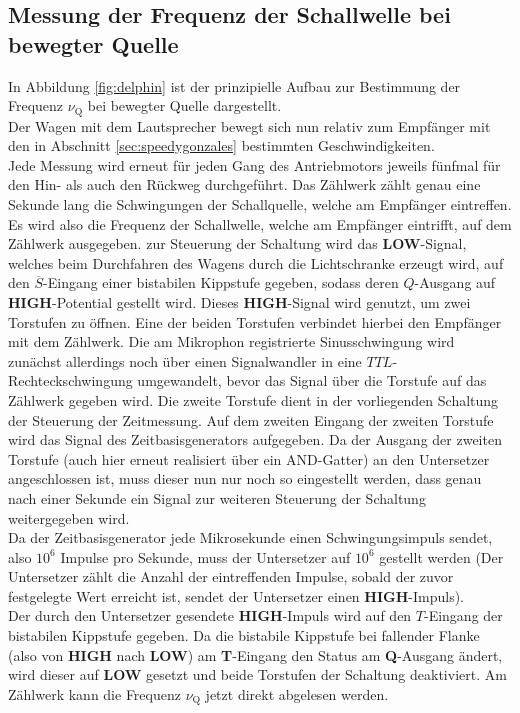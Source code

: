 \FloatBarrier
\subsection{Messung der Frequenz der Schallwelle bei bewegter Quelle}
\label{sec:frequenz}
In Abbildung \ref{fig:delphin} ist der prinzipielle Aufbau zur Bestimmung der Frequenz $\nu_{\mathrm{Q}}$ bei bewegter Quelle dargestellt.\\
Der Wagen mit dem Lautsprecher bewegt sich nun relativ zum Empfänger mit den in Abschnitt \ref{sec:speedygonzales} bestimmten Geschwindigkeiten.\\
Jede Messung wird erneut für jeden Gang des Antriebmotors jeweils fünfmal für den Hin- als auch den Rückweg durchgeführt.
Das Zählwerk zählt genau eine Sekunde lang die Schwingungen der Schallquelle, welche am Empfänger eintreffen. Es wird also die Frequenz der Schallwelle, welche am Empfänger eintrifft, auf dem Zählwerk ausgegeben.
zur Steuerung der Schaltung wird das \textbf{LOW}-Signal, welches beim Durchfahren des Wagens durch die Lichtschranke erzeugt wird, auf den $\overline{S}$-Eingang einer bistabilen Kippstufe gegeben, sodass deren $Q$-Ausgang auf \textbf{HIGH}-Potential gestellt wird.
Dieses \textbf{HIGH}-Signal wird genutzt, um zwei Torstufen zu öffnen.
Eine der beiden Torstufen verbindet hierbei den Empfänger mit dem Zählwerk.
Die am Mikrophon registrierte Sinusschwingung wird zunächst allerdings noch über einen Signalwandler in eine $TTL$-Rechteckschwingung umgewandelt, bevor das Signal über die Torstufe auf das Zählwerk gegeben wird.
Die zweite Torstufe dient in der vorliegenden Schaltung der Steuerung der Zeitmessung.
Auf dem zweiten Eingang der zweiten Torstufe wird das Signal des Zeitbasisgenerators aufgegeben.
Da der Ausgang der zweiten Torstufe (auch hier erneut realisiert über ein AND-Gatter) an den Untersetzer angeschlossen ist, muss dieser nun nur noch so eingestellt werden, dass genau nach einer Sekunde ein Signal
zur weiteren Steuerung der Schaltung weitergegeben wird.\\
Da der Zeitbasisgenerator jede Mikrosekunde einen Schwingungsimpuls sendet, also $10^6$ Impulse pro Sekunde, muss der Untersetzer auf $10^6$ gestellt werden (Der Untersetzer zählt die Anzahl der eintreffenden Impulse, sobald der zuvor festgelegte Wert erreicht ist, sendet der Untersetzer einen \textbf{HIGH}-Impuls).\\
Der durch den Untersetzer gesendete \textbf{HIGH}-Impuls wird auf den $T$-Eingang der bistabilen Kippstufe gegeben. Da die bistabile Kippstufe bei fallender Flanke (also von \textbf{HIGH} nach \textbf{LOW}) am \textbf{T}-Eingang den Status am \textbf{Q}-Ausgang ändert, wird dieser auf \textbf{LOW} gesetzt und beide Torstufen der Schaltung deaktiviert.
Am Zählwerk kann die Frequenz $\nu_{\mathrm{Q}}$ jetzt direkt abgelesen werden.

